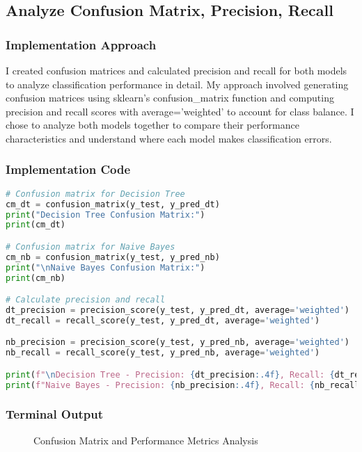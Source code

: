 \documentclass[12pt,a4paper]{article}
\begin{document}
\subsection{Analyze Confusion Matrix, Precision, Recall}

\subsubsection{Implementation Approach}
I created confusion matrices and calculated precision and recall for both models to analyze classification performance in detail. My approach involved generating confusion matrices using sklearn's confusion\_matrix function and computing precision and recall scores with average='weighted' to account for class balance. I chose to analyze both models together to compare their performance characteristics and understand where each model makes classification errors.

\subsubsection{Implementation Code}
\begin{lstlisting}[language=Python, caption=Analyze Confusion Matrix Precision Recall]
# Confusion matrix for Decision Tree
cm_dt = confusion_matrix(y_test, y_pred_dt)
print("Decision Tree Confusion Matrix:")
print(cm_dt)

# Confusion matrix for Naive Bayes
cm_nb = confusion_matrix(y_test, y_pred_nb)
print("\nNaive Bayes Confusion Matrix:")
print(cm_nb)

# Calculate precision and recall
dt_precision = precision_score(y_test, y_pred_dt, average='weighted')
dt_recall = recall_score(y_test, y_pred_dt, average='weighted')

nb_precision = precision_score(y_test, y_pred_nb, average='weighted')
nb_recall = recall_score(y_test, y_pred_nb, average='weighted')

print(f"\nDecision Tree - Precision: {dt_precision:.4f}, Recall: {dt_recall:.4f}")
print(f"Naive Bayes - Precision: {nb_precision:.4f}, Recall: {nb_recall:.4f}")
\end{lstlisting}

\subsubsection{Terminal Output}

\begin{figure}[h!]
    \centering
    \caption{Confusion Matrix and Performance Metrics Analysis}
\end{figure}
\end{document}
